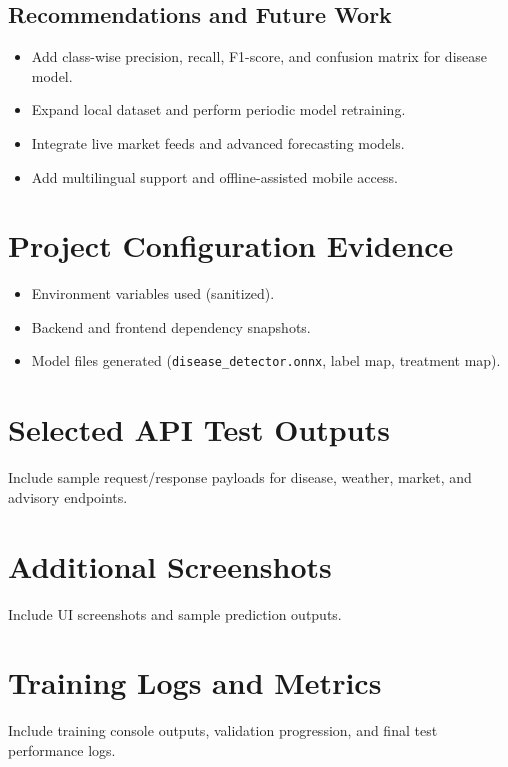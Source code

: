 \documentclass[12pt,a4paper]{report}
\begin{document}
\section{Recommendations and Future Work}
\begin{itemize}[noitemsep]
    \item Add class-wise precision, recall, F1-score, and confusion matrix for disease model.
    \item Expand local dataset and perform periodic model retraining.
    \item Integrate live market feeds and advanced forecasting models.
    \item Add multilingual support and offline-assisted mobile access.
\end{itemize}




\appendix

\chapter{Project Configuration Evidence}
\begin{itemize}
    \item Environment variables used (sanitized).
    \item Backend and frontend dependency snapshots.
    \item Model files generated (\texttt{disease\_detector.onnx}, label map, treatment map).
\end{itemize}

\chapter{Selected API Test Outputs}
Include sample request/response payloads for disease, weather, market, and advisory endpoints.

\chapter{Additional Screenshots}
Include UI screenshots and sample prediction outputs.

\chapter{Training Logs and Metrics}
Include training console outputs, validation progression, and final test performance logs.
\end{document}
